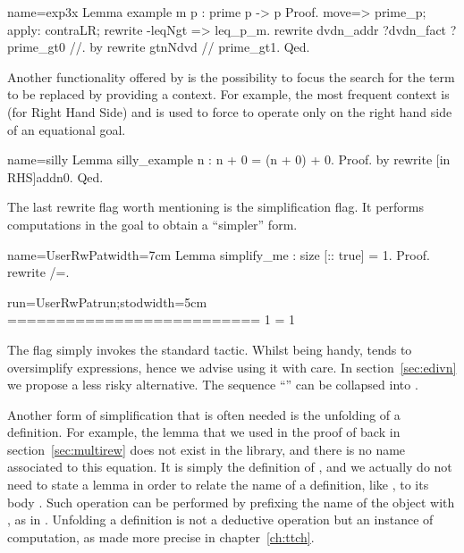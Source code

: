 \begin{coq}{name=exp3x}{}
Lemma example m p : prime p -> p %
Proof.
move=> prime_p; apply: contraLR; rewrite -leqNgt => leq_p_m.
rewrite dvdn_addr ?dvdn_fact ?prime_gt0 //.
by rewrite gtnNdvd // prime_gt1.
Qed.
\end{coq}

Another functionality offered by  is the possibility
to focus the search for the term to be replaced by providing a
context.  For example, the most frequent context is  (for Right
Hand Side) and is used to force  to operate only on the right
hand side of an equational goal.

\begin{coq}{name=silly}{}
Lemma silly_example n : n + 0 = (n + 0) + 0.
Proof. by rewrite [in RHS]addn0. Qed.
\end{coq}


The last rewrite flag worth mentioning is the \C{/=} simplification
flag.  It performs computations in the goal to obtain a ``simpler'' form.

\begin{coq-left}{name=UserRwPat}{width=7cm}
Lemma simplify_me : size [:: true] = 1.
Proof.
rewrite /=.
\end{coq-left}
\begin{coqout-right}{run=UserRwPatrun;stod}{width=5cm}
==========================
1 = 1
\end{coqout-right}

The \C{/=} flag simply invokes the \Coq{} standard 
tactic.  Whilst being handy,  tends to oversimplify
expressions, hence we advise using it with care.
In section~\ref{sec:edivn} we propose a less risky alternative.
The sequence ``\C{// /=}'' can be collapsed into \C{//=}.

Another form of simplification that is often needed is the
unfolding of a definition.
For example, the lemma  that we used in
the proof of  back in section~\ref{sec:multirew}
does not exist in the library, and there is no name associated to this
equation. It is simply the definition of , and we actually do
not need to state a lemma in order to relate
the name of a definition, like , to its body
. Such operation can be performed by
prefixing the name of the
object with \C{/}, as in . Unfolding a definition is
not a deductive operation but an instance of computation, as
made more precise in chapter~\ref{ch:ttch}.

